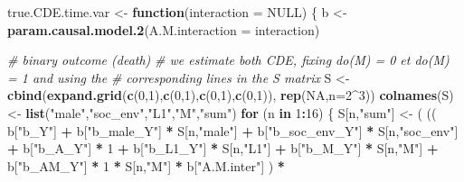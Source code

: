 \documentclass[
]{book}
\newenvironment{Shaded}{\begin{snugshade}}{\end{snugshade}}
\newcommand{\AttributeTok}[1]{\textcolor[rgb]{0.13,0.29,0.53}{#1}}
\newcommand{\CommentTok}[1]{\textcolor[rgb]{0.56,0.35,0.01}{\textit{#1}}}
\newcommand{\ConstantTok}[1]{\textcolor[rgb]{0.56,0.35,0.01}{#1}}
\newcommand{\ControlFlowTok}[1]{\textcolor[rgb]{0.13,0.29,0.53}{\textbf{#1}}}
\newcommand{\DecValTok}[1]{\textcolor[rgb]{0.00,0.00,0.81}{#1}}
\newcommand{\FunctionTok}[1]{\textcolor[rgb]{0.13,0.29,0.53}{\textbf{#1}}}
\newcommand{\NormalTok}[1]{#1}
\newcommand{\OtherTok}[1]{\textcolor[rgb]{0.56,0.35,0.01}{#1}}
\newcommand{\SpecialCharTok}[1]{\textcolor[rgb]{0.81,0.36,0.00}{\textbf{#1}}}
\newcommand{\StringTok}[1]{\textcolor[rgb]{0.31,0.60,0.02}{#1}}
\begin{document}
\begin{Shaded}
\begin{Highlighting}[]
\NormalTok{true.CDE.time.var }\OtherTok{\textless{}{-}} \ControlFlowTok{function}\NormalTok{(}\AttributeTok{interaction =} \ConstantTok{NULL}\NormalTok{) \{}
\NormalTok{  b }\OtherTok{\textless{}{-}} \FunctionTok{param.causal.model.2}\NormalTok{(}\AttributeTok{A.M.interaction =}\NormalTok{ interaction)}
  
  \CommentTok{\# binary outcome (death)}
  \CommentTok{\# we estimate both CDE, fixing do(M) = 0 et do(M) = 1 and using the }
  \CommentTok{\# corresponding lines in the S matrix}
\NormalTok{  S }\OtherTok{\textless{}{-}} \FunctionTok{cbind}\NormalTok{(}\FunctionTok{expand.grid}\NormalTok{(}\FunctionTok{c}\NormalTok{(}\DecValTok{0}\NormalTok{,}\DecValTok{1}\NormalTok{),}\FunctionTok{c}\NormalTok{(}\DecValTok{0}\NormalTok{,}\DecValTok{1}\NormalTok{),}\FunctionTok{c}\NormalTok{(}\DecValTok{0}\NormalTok{,}\DecValTok{1}\NormalTok{),}\FunctionTok{c}\NormalTok{(}\DecValTok{0}\NormalTok{,}\DecValTok{1}\NormalTok{)), }\FunctionTok{rep}\NormalTok{(}\ConstantTok{NA}\NormalTok{,}\AttributeTok{n=}\DecValTok{2}\SpecialCharTok{\^{}}\DecValTok{3}\NormalTok{))}
  \FunctionTok{colnames}\NormalTok{(S) }\OtherTok{\textless{}{-}} \FunctionTok{list}\NormalTok{(}\StringTok{"male"}\NormalTok{,}\StringTok{"soc\_env"}\NormalTok{,}\StringTok{"L1"}\NormalTok{,}\StringTok{"M"}\NormalTok{,}\StringTok{"sum"}\NormalTok{)}
  \ControlFlowTok{for}\NormalTok{ (n }\ControlFlowTok{in} \DecValTok{1}\SpecialCharTok{:}\DecValTok{16}\NormalTok{) \{}
\NormalTok{    S[n,}\StringTok{"sum"}\NormalTok{] }\OtherTok{\textless{}{-}}\NormalTok{ ( (( b[}\StringTok{"b\_Y"}\NormalTok{] }\SpecialCharTok{+} 
\NormalTok{                        b[}\StringTok{"b\_male\_Y"}\NormalTok{] }\SpecialCharTok{*}\NormalTok{ S[n,}\StringTok{"male"}\NormalTok{] }\SpecialCharTok{+} 
\NormalTok{                        b[}\StringTok{"b\_soc\_env\_Y"}\NormalTok{] }\SpecialCharTok{*}\NormalTok{ S[n,}\StringTok{"soc\_env"}\NormalTok{] }\SpecialCharTok{+} 
\NormalTok{                        b[}\StringTok{"b\_A\_Y"}\NormalTok{] }\SpecialCharTok{*} \DecValTok{1} \SpecialCharTok{+} 
\NormalTok{                        b[}\StringTok{"b\_L1\_Y"}\NormalTok{] }\SpecialCharTok{*}\NormalTok{ S[n,}\StringTok{"L1"}\NormalTok{] }\SpecialCharTok{+}
\NormalTok{                        b[}\StringTok{"b\_M\_Y"}\NormalTok{] }\SpecialCharTok{*}\NormalTok{ S[n,}\StringTok{"M"}\NormalTok{] }\SpecialCharTok{+}
\NormalTok{                        b[}\StringTok{"b\_AM\_Y"}\NormalTok{] }\SpecialCharTok{*} \DecValTok{1} \SpecialCharTok{*}\NormalTok{ S[n,}\StringTok{"M"}\NormalTok{] }\SpecialCharTok{*}\NormalTok{ b[}\StringTok{"A.M.inter"}\NormalTok{] ) }\SpecialCharTok{*}

\end{Highlighting}
\end{Shaded}
\end{document}
